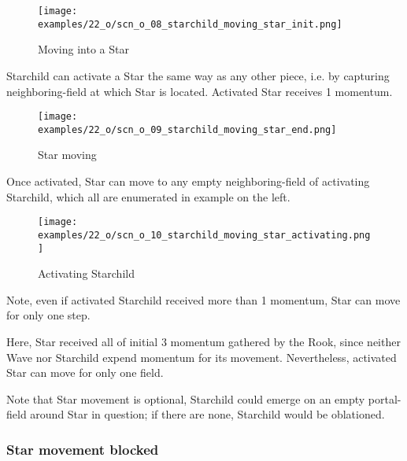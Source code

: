 \noindent
\begin{wrapfigure}[5]{l}{0.4\textwidth}
\centering
\texttt{[image: examples/22\_o/scn\_o\_08\_starchild\_moving\_star\_init.png]}
\caption{Moving into a Star}
\label{fig:scn_o_08_starchild_moving_star_init}
\end{wrapfigure}
Starchild can activate a Star the same way as any other piece, i.e. by capturing
neighboring-field at which Star is located. Activated Star receives 1 momentum.

\vspace*{2.1\baselineskip}
\noindent
\begin{wrapfigure}[4]{l}{0.4\textwidth}
\centering
\texttt{[image: examples/22\_o/scn\_o\_09\_starchild\_moving\_star\_end.png]}
\caption{Star moving}
\label{fig:scn_o_09_starchild_moving_star_end}
\end{wrapfigure}
Once activated, Star can move to any empty neighboring-field of activating Starchild,
which all are enumerated in example on the left.

\vspace*{2.3\baselineskip}
\noindent
\begin{wrapfigure}[8]{l}{0.4\textwidth}
\centering
\texttt{[image: examples/22\_o/scn\_o\_10\_starchild\_moving\_star\_activating.png]}
\caption{Activating Starchild}
\label{fig:scn_o_10_starchild_moving_star_activating}
\end{wrapfigure}
Note, even if activated Starchild received more than 1 momentum, Star can move for
only one step.

Here, Star received all of initial 3 momentum gathered by the Rook, since neither
Wave nor Starchild expend momentum for its movement. Nevertheless, activated Star
can move for only one field.

Note that Star movement is optional, Starchild could emerge on an empty portal-field
around Star in question; if there are none, Starchild would be oblationed.

\clearpage %

\subsubsection*{Star movement blocked}

